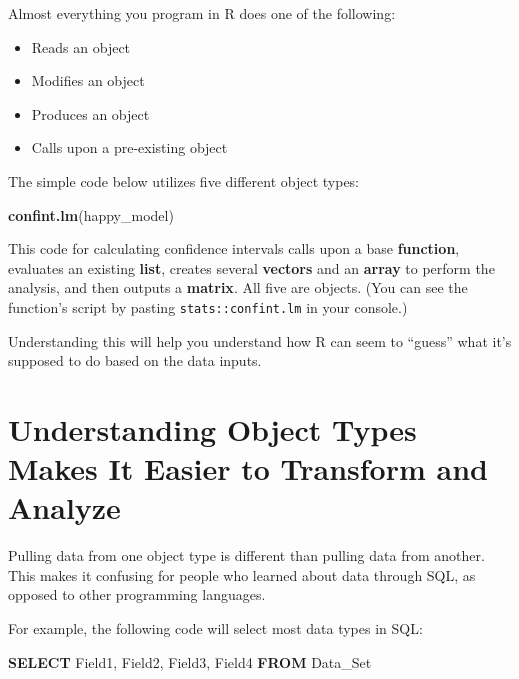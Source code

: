 \documentclass[
]{book}
\newenvironment{Shaded}{\begin{snugshade}}{\end{snugshade}}
\newcommand{\KeywordTok}[1]{\textcolor[rgb]{0.13,0.29,0.53}{\textbf{#1}}}
\newcommand{\NormalTok}[1]{#1}
\providecommand{\tightlist}{%
  \setlength{\itemsep}{0pt}\setlength{\parskip}{0pt}}
\begin{document}
Almost everything you program in R does one of the following:

\begin{itemize}
\tightlist
\item
  Reads an object
\item
  Modifies an object
\item
  Produces an object
\item
  Calls upon a pre-existing object
\end{itemize}

The simple code below utilizes five different object types:

\begin{Shaded}
\begin{Highlighting}[]
\KeywordTok{confint.lm}\NormalTok{(happy_model)}
\end{Highlighting}
\end{Shaded}

This code for calculating confidence intervals calls upon a base \textbf{function}, evaluates an existing \textbf{list}, creates several \textbf{vectors} and an \textbf{array} to perform the analysis, and then outputs a \textbf{matrix}. All five are objects. (You can see the function's script by pasting \texttt{stats::confint.lm} in your console.)

Understanding this will help you understand how R can seem to ``guess'' what it's supposed to do based on the data inputs.

\hypertarget{understanding-object-types-makes-it-easier-to-transform-and-analyze}{%
\section{Understanding Object Types Makes It Easier to Transform and Analyze}\label{understanding-object-types-makes-it-easier-to-transform-and-analyze}}

Pulling data from one object type is different than pulling data from another. This makes it confusing for people who learned about data through SQL, as opposed to other programming languages.

For example, the following code will select most data types in SQL:

\begin{Shaded}
\begin{Highlighting}[]
\KeywordTok{SELECT}
\NormalTok{  Field1,}
\NormalTok{  Field2,}
\NormalTok{  Field3,}
\NormalTok{  Field4}
\KeywordTok{FROM}
\NormalTok{  Data_Set}
\end{Highlighting}
\end{Shaded}
\end{document}

